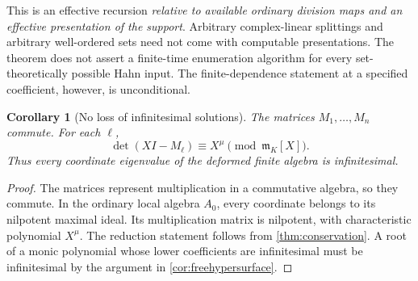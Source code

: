 \documentclass[11pt]{article}
\newtheorem{corollary}[theorem]{Corollary}
\theoremstyle{definition}
\newcommand{\mm}{\mathfrak m}
\begin{document}
This is an effective recursion \emph{relative to available ordinary division maps and an effective presentation of the support}. Arbitrary complex-linear splittings and arbitrary well-ordered sets need not come with computable presentations. The theorem does not assert a finite-time enumeration algorithm for every set-theoretically possible Hahn input. The finite-dependence statement at a specified coefficient, however, is unconditional.

\begin{corollary}[No loss of infinitesimal solutions]\label{cor:matrices}
The matrices $M_1,\ldots,M_n$ commute. For each $\ell$,
\begin{equation}\label{eq:characteristicreduction}
 \det(XI-M_\ell)\equiv X^\mu\pmod{\mm_K[X]}.
\end{equation}
Thus every coordinate eigenvalue of the deformed finite algebra is infinitesimal.
\end{corollary}
\begin{proof}
The matrices represent multiplication in a commutative algebra, so they commute. In the ordinary local algebra $A_0$, every coordinate belongs to its nilpotent maximal ideal. Its multiplication matrix is nilpotent, with characteristic polynomial $X^\mu$. The reduction statement follows from \cref{thm:conservation}. A root of a monic polynomial whose lower coefficients are infinitesimal must be infinitesimal by the argument in \cref{cor:freehypersurface}.
\end{proof}
\end{document}
